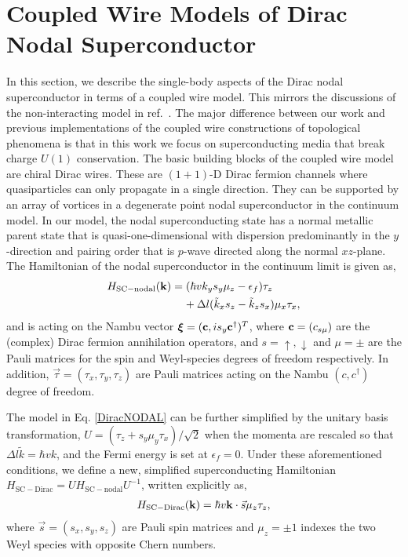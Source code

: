 \section{Coupled Wire Models of Dirac Nodal Superconductor}\label{sec:coupled}
In this section, we describe the single-body aspects of the Dirac nodal superconductor in terms of a coupled wire model. This mirrors the discussions of the non-interacting model in ref.~\cite{RazaSirotaTeo17}. The major difference between our work and previous implementations of the coupled wire constructions of topological phenomena is that in this work we focus on superconducting media that break charge $U(1)$ conservation. The basic building blocks of the coupled wire model are chiral Dirac wires. These are $(1+1)$-D Dirac fermion channels where quasiparticles can only propagate in a single direction. They can be supported by an array of vortices in a degenerate point nodal superconductor in the continuum model. In our model, the nodal superconducting state has a normal metallic parent state that is quasi-one-dimensional with dispersion predominantly in the $y$-direction and pairing order that is $p$-wave directed along the normal $xz$-plane. The Hamiltonian of the nodal superconductor in the continuum limit is given as,
\begin{align}
H_{\mathrm{SC-nodal}}({\bf k})&=(\hbar vk_ys_y\mu_z-\epsilon_f)\tau_z\nonumber\\&\;\;\;\;+\Delta l(\tilde{k}_xs_z-\tilde{k}_zs_x)\mu_x\tau_x,
\label{DiracNODAL}
\end{align}
and is acting on the Nambu vector $\boldsymbol\xi=({\bf c},is_y{\bf c}^\dagger)^T$, where ${\bf c}=(c_{s\mu})$ are the (complex) Dirac fermion annihilation operators, and $s=\uparrow,\downarrow$ and $\mu=\pm$ are the Pauli matrices for the spin and Weyl-species degrees of freedom respectively. In addition, $\vec\tau=(\tau_x,\tau_y,\tau_z)$ are Pauli matrices acting on the Nambu $(c,c^\dagger)$ degree of freedom.

The model in Eq. \eqref{DiracNODAL} can be further simplified by the unitary basis transformation, $U=(\tau_z+s_y\mu_y\tau_x)/\sqrt{2}$ when the momenta are rescaled so that $\Delta l\tilde{k}=\hbar vk$, and the Fermi energy is set at $\epsilon_f=0$. Under these aforementioned conditions, we define a new, simplified superconducting Hamiltonian $H_{\mathrm{SC-Dirac}}=UH_{\mathrm{SC-nodal}}U^{-1}$, written explicitly as,
\begin{align}
H_{\mathrm{SC-Dirac}}({\bf k})=\hbar v{\bf k}\cdot\vec{s}\mu_z\tau_z,
\label{DiracSC}
\end{align}
where $\vec{s}=(s_x,s_y,s_z)$ are Pauli spin matrices and $\mu_z=\pm1$ indexes the two Weyl species with opposite Chern numbers.

